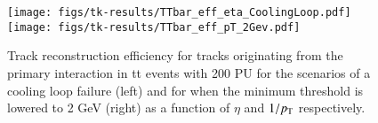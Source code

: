 \begin{figure}[!t]
\centering
\texttt{[image: figs/tk-results/TTbar\_eff\_eta\_CoolingLoop.pdf]}
\hfill
\texttt{[image: figs/tk-results/TTbar\_eff\_pT\_2Gev.pdf]}
\caption{Track reconstruction efficiency for tracks originating from the primary interaction in
tt events with 200 PU for the scenarios of a cooling loop failure (left) and for when the minimum \pt threshold is lowered to 2 GeV (right) as a function of $\eta$ and $1/p_{\mathrm{T}}$ respectively.}
\label{fig:RobustPlots}
\end{figure}
